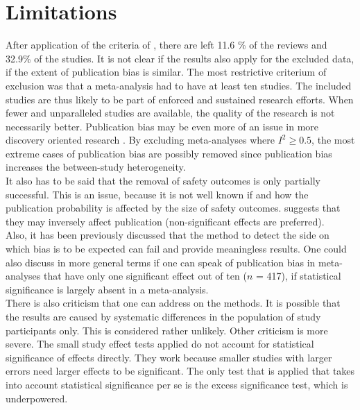 \documentclass[11pt,a4paper,twoside]{book}\usepackage[]{graphicx}\usepackage[]{color}
\begin{document}
\section{Limitations}
After application of the criteria of \citet{Ioannidis2007}, there are left 11.6 \% of the reviews and 32.9\% of the studies. It is not clear if the results also apply for the excluded data, \ie if the extent of publication bias is similar. The most restrictive criterium of exclusion was that a meta-analysis had to have at least ten studies. The included studies are thus likely to be part of enforced and sustained research efforts. When fewer and unparalleled studies are available, the quality of the research is not necessarily better. Publication bias may be even more of an issue in more discovery oriented research \citet{ioannidis.2005}. By excluding meta-analyses where $I^2 \geq 0.5$, the most extreme cases of publication bias are possibly removed since publication bias increases the between-study heterogeneity.\\
It also has to be said that the removal of safety outcomes is only partially successful. This is an issue, because it is not well known if and how the publication probability is affected by the size of safety outcomes. \citet{kicinsky} suggests that they may inversely affect publication (\ie non-significant effects are preferred).\\
Also, it has been previously discussed that the method to detect the side on which bias is to be expected can fail and provide meaningless results. One could also discuss in more general terms if one can speak of publication bias in meta-analyses that have only one significant effect out of ten ($n$ = 417), \ie if statistical significance is largely absent in a meta-analysis.\\
There is also criticism that one can address on the methods. It is possible that the results are caused by systematic differences in the population of study participants only. This is considered rather unlikely. Other criticism is more severe. The small study effect tests applied do not account for statistical significance of effects directly. They work because smaller studies with larger errors need larger effects to be significant. The only test that is applied that takes into account statistical significance per se is the excess significance test, which is underpowered.\\
\end{document}
